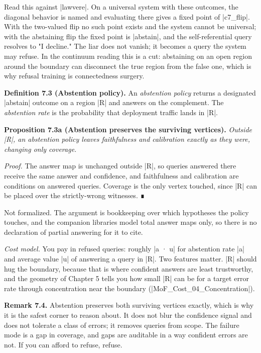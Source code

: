 \documentclass{memoir}
\begin{document}
Read this against \LeanVerb|lawvere|. On a universal system with these outcomes,
the diagonal behavior is named and evaluating there gives a fixed point of
\LeanVerb|c7_flip|. With the two-valued flip no such point exists and the system
cannot be universal; with the abstaining flip the fixed point is \LeanVerb|abstain|, and
the self-referential query resolves to "I decline." The liar does not vanish; it
becomes a query the system may refuse. In the continuum reading this is a cut:
abstaining on an open region around the boundary can disconnect the true region
from the false one, which is why refusal training is connectedness surgery.

\textbf{Definition 7.3 (Abstention policy).} An \emph{abstention policy} returns a designated
\LeanVerb|abstain| outcome on a region \LeanVerb|R| and answers on the complement. The \emph{abstention
rate} is the probability that deployment traffic lands in \LeanVerb|R|.

\textbf{Proposition 7.3a (Abstention preserves the surviving vertices).} \emph{Outside \LeanVerb|R|, an
abstention policy leaves faithfulness and calibration exactly as they were,
changing only coverage.}

\emph{Proof.} The answer map is unchanged outside \LeanVerb|R|, so queries answered there receive
the same answer and confidence, and faithfulness and calibration are conditions
on answered queries. Coverage is the only vertex touched, since \LeanVerb|R| can be
placed over the strictly-wrong witnesses. ∎

Not formalized. The argument is bookkeeping over which hypotheses the policy
touches, and the companion libraries model total answer maps only, so there is
no declaration of partial answering for it to cite.

\emph{Cost model.} You pay in refused queries: roughly \LeanVerb|a · u| for abstention rate
\LeanVerb|a| and average value \LeanVerb|u| of answering a query in \LeanVerb|R|. Two features matter. \LeanVerb|R|
should hug the boundary, because that is where confident answers are least
trustworthy, and the geometry of Chapter 5 tells you how small \LeanVerb|R| can be for a
target error rate through concentration near the boundary
(\LeanVerb|MoF_Cost_04_Concentration|).

\textbf{Remark 7.4.} Abstention preserves both surviving vertices exactly, which is why it
is the safest corner to reason about. It does not blur the confidence signal and
does not tolerate a class of errors; it removes queries from scope. The failure
mode is a gap in coverage, and gaps are auditable in a way confident errors are
not. If you can afford to refuse, refuse.
\end{document}
